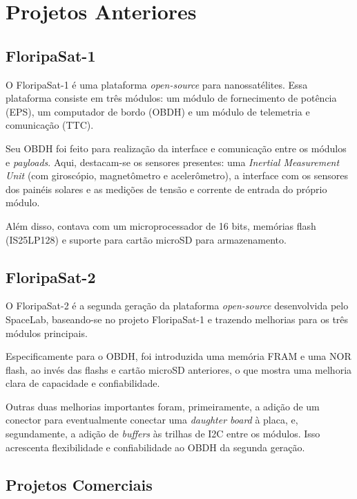 
\section{Projetos Anteriores}

\subsection{FloripaSat-1}
O FloripaSat-1 é uma plataforma \textit{open-source} para nanossatélites. Essa plataforma consiste em três módulos: um módulo de fornecimento de potência (EPS), um computador de bordo (OBDH) e um módulo de telemetria e comunicação (TTC).

Seu OBDH foi feito para realização da interface e comunicação entre os módulos e \textit{payloads}. Aqui, destacam-se os sensores presentes: uma \textit{Inertial Measurement Unit} (com giroscópio, magnetômetro e acelerômetro), a interface com os sensores dos painéis solares e as medições de tensão e corrente de entrada do próprio módulo.

Além disso, contava com um microprocessador de 16 bits, memórias flash (IS25LP128) e suporte para cartão microSD para armazenamento.

\subsection{FloripaSat-2}
O FloripaSat-2 é a segunda geração da plataforma \textit{open-source} desenvolvida pelo SpaceLab, baseando-se no projeto FloripaSat-1 e trazendo melhorias para os três módulos principais.

Especificamente para o OBDH, foi introduzida uma memória FRAM e uma NOR flash, ao invés das flashs e cartão microSD anteriores, o que mostra uma melhoria clara de capacidade e confiabilidade. 

Outras duas melhorias importantes foram, primeiramente, a adição de um conector para eventualmente conectar uma \textit{daughter board} à placa, e, segundamente, a adição de \textit{buffers} às trilhas de I2C entre os módulos. Isso acrescenta flexibilidade e confiabilidade ao OBDH da segunda geração.

\subsection{Projetos Comerciais}

